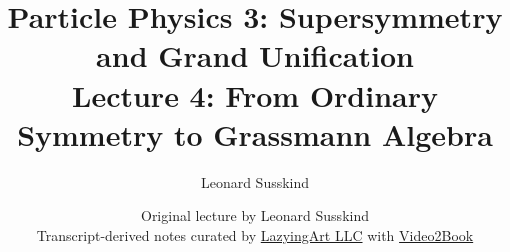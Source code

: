 \documentclass[11pt,oneside]{book}
\begin{document}
\frontmatter
\title{Particle Physics 3: Supersymmetry and Grand Unification\\[0.5em]
\large Lecture 4: From Ordinary Symmetry to Grassmann Algebra}
\author{Leonard Susskind}
\date{Original lecture by Leonard Susskind\\[0.4em]
Transcript-derived notes curated by
\href{https://lazying.art}{LazyingArt LLC} with
\href{https://github.com/lachlanchen/Video2Book}{Video2Book}}
\maketitle
\mainmatter

\end{document}
